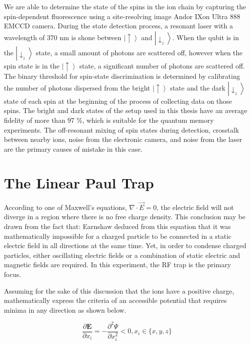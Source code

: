 We are able to determine the state of the spins in the ion chain by capturing the spin-dependent fluorescence using a site-resolving image Andor IXon Ultra 888 EMCCD camera. During the state detection process, a resonant laser with a wavelength of 370 nm is shone between $\left|\uparrow\right\rangle$ and $\left|\downarrow_z\right\rangle$. When the qubit is in the $\left|\downarrow_z\right\rangle$ state, a small amount of photons are scattered off, however when the spin state is in the $\left|\uparrow\right\rangle$ state, a significant number of photons are scattered off. The binary threshold for spin-state discrimination is determined by calibrating the number of photons dispersed from the bright $\left|\uparrow\right\rangle$ state and the dark $\left|\downarrow_z\right\rangle$ state of each spin at the beginning of the process of collecting data on those spins. The bright and dark states of the setup used in this thesis have an average fidelity of more than 97 \%, which is suitable for the quantum memory experiments. The off-resonant mixing of spin states during detection, crosstalk between nearby ions, noise from the electronic camera, and noise from the laser are the primary causes of mistake in this case.


\section{The Linear Paul Trap}

According to one of Maxwell's equations, $\nabla \cdot \vec{E}=0$, the electric field will not diverge in a region where there is no free charge density. This conclusion may be drawn from the fact that: Earnshaw deduced from this equation that it was mathematically impossible for a charged particle to be connected in a static electric field in all directions at the same time. Yet, in order to condense charged particles, either oscillating electric fields or a combination of static electric and magnetic fields are required. In this experiment, the RF trap is the primary focus.

Assuming for the sake of this discussion that the ions have a positive charge, mathematically express the criteria of an accessible potential that requires minima in any direction as shown below.

\begin{equation}\label{eq:minima}
    \frac{\partial \mathbf{E}}{\partial x_i}=-\frac{\partial^2 \Psi}{\partial x_i^2}<0, x_i \in\{x, y, z\}
\end{equation}

